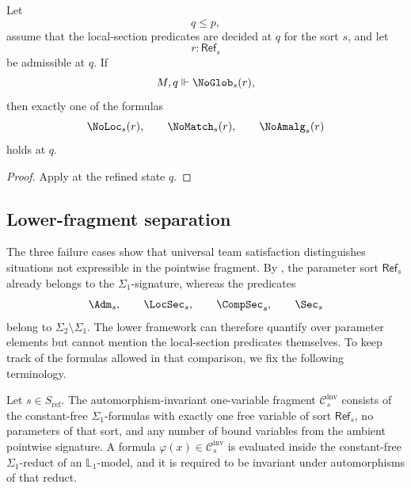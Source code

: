 \begin{theorem}\label{thm:null-classification-under-refinement}
Let
\[
q\le p,
\]
assume that the local-section predicates are decided at $q$ for the sort $s$, and let
\[
r:\mathsf{Ref}_s
\]
be admissible at $q$. If
\[
M,q\Vdash \NoGlob_s(r),
\]
then exactly one of the formulas
\[
\NoLoc_s(r),\qquad
\NoMatch_s(r),\qquad
\NoAmalg_s(r)
\]
holds at $q$.
\end{theorem}

\begin{proof}
Apply  at the refined state $q$.
\end{proof}

\subsection{Lower-fragment separation}

The three failure cases show that universal team satisfaction distinguishes situations not expressible in the pointwise fragment. By , the parameter sort $\mathsf{Ref}_s$ already belongs to the $\Sigma_1$-signature, whereas the predicates
\[
\Adm_s,\qquad \LocSec_s,\qquad \CompSec_s,\qquad \Sec_s
\]
belong to $\Sigma_2\setminus\Sigma_1$. The lower framework can therefore quantify over parameter elements but cannot mention the local-section predicates themselves. To keep track of the formulas allowed in that comparison, we fix the following terminology.

\begin{definition}\label{def:lower-comparison-class}
Let $s\in S_{\mathrm{ref}}$. The automorphism-invariant one-variable fragment $\mathcal{C}_{s}^{\mathrm{inv}}$ consists of the constant-free $\Sigma_1$-formulas with exactly one free variable of sort $\mathsf{Ref}_s$, no parameters of that sort, and any number of bound variables from the ambient pointwise signature. A formula $\varphi(x)\in\mathcal{C}_{s}^{\mathrm{inv}}$ is evaluated inside the constant-free $\Sigma_1$-reduct of an $\mathbb L_1$-model, and it is required to be invariant under automorphisms of that reduct.
\end{definition}

